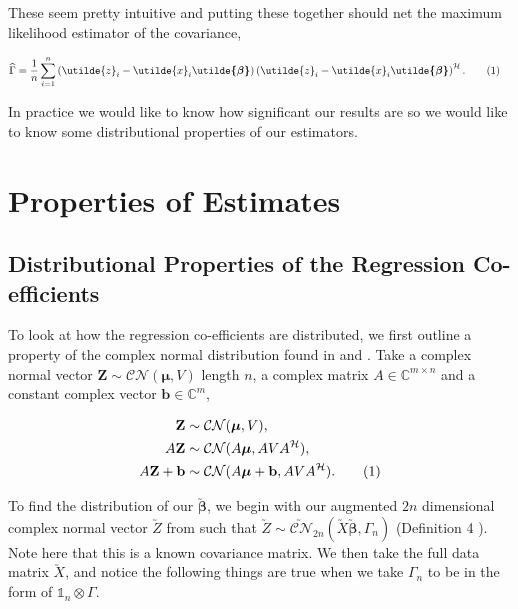 \documentclass[honours,12pt]{unswthesis}
\newcommand{\augb}{\bm{\utilde{\beta}}}
\newcommand{\ct}{\mathcal{H}}
\newcommand\numberthis{\addtocounter{equation}{1}\tag{\theequation}}
\numberwithin{equation}{section}
\begin{document}
\noindent These seem pretty intuitive and putting these together should net the maximum likelihood estimator of the covariance,

\begin{align*}
    \widehat{\Gamma} &= \frac{1}{n} \sum_{i = 1}^{n} \left( \utilde{z}_{i} - \utilde{x}_{i} \augb \right) \left( \utilde{z}_{i} - \utilde{x}_{i} \augb \right)^{\ct}. \numberthis \label{gamma_mle}
\end{align*}

\noindent In practice we would like to know how significant our results are so we would like to know some distributional properties of our estimators.


\section{Properties of Estimates}


\subsection{Distributional Properties of the Regression Co-efficients}

\noindent To look at how the regression co-efficients are distributed, we first outline a property of the complex normal distribution found in \cite{ducharme2016} and \cite{wikicomplexnorm}. Take a complex normal vector $\mathbf{Z} \sim \mathcal{CN} ( \bm{\mu}, V )$ length $n$, a complex matrix $A \in \mathbb{C}^{m \times n}$ and a constant complex vector $\mathbf{b} \in \mathbb{C}^{m}$,

\begin{align*}
	\mathbf{Z} &\sim \mathcal{CN} ( \bm{\mu}, V ), \\
	A \mathbf{Z} &\sim \mathcal{CN} ( A \bm{\mu}, A V A^{\ct} ), \\
	A \mathbf{Z} + \mathbf{b} &\sim \mathcal{CN} ( A \bm{\mu} + \mathbf{b}, A V A^{\ct} ). \numberthis \label{CN_property}
\end{align*}

To find the distribution of our $\utilde{\bm{\beta}}$, we begin with our augmented $2n$ dimensional complex normal vector $\utilde{Z}$ from  such that $\utilde{Z} \sim \utilde{\mathcal{CN}}_{2 n} \left( \utilde{X} \utilde{\bm{\beta}}, \Gamma_{n} \right)$ (Definition 4 \cite{ducharme2016}). Note here that this is a known covariance matrix. We then take the full data matrix $\utilde{X}$, and notice the following things are true when we take $\Gamma_{n}$ to be in the form of $\mathbb{1}_{n} \otimes \Gamma$.
\end{document}
